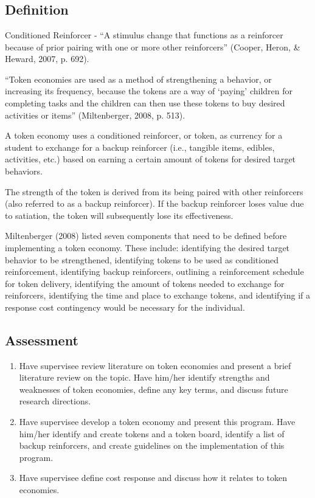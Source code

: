 \section[\fourfTwo{}]{\fourfTwo{}%
              }
\subsection{Definition}
Conditioned Reinforcer - ``A stimulus change that functions as a reinforcer because of prior pairing with one or more other reinforcers'' (Cooper, Heron, \& Heward, 2007, p. 692).

``Token economies are used as a method of strengthening a behavior, or increasing its frequency, because the tokens are a way of ‘paying' children for completing tasks and the children can then use these tokens to buy desired activities or items'' (Miltenberger, 2008, p. 513).

A token economy uses a conditioned reinforcer, or token, as currency for a student to exchange for a backup reinforcer (i.e., tangible items, edibles, activities, etc.) based on earning a certain amount of tokens for desired target behaviors. 

The strength of the token is derived from its being paired with other reinforcers (also referred to as a backup reinforcer). If the backup reinforcer loses value due to satiation, the token will subsequently lose its effectiveness.

Miltenberger (2008) listed seven components that need to be defined before implementing a token economy. These include: identifying the desired target behavior to be strengthened, identifying tokens to be used as conditioned reinforcement, identifying backup reinforcers, outlining a reinforcement schedule for token delivery, identifying the amount of tokens needed to exchange for reinforcers, identifying the time and place to exchange tokens, and identifying if a response cost contingency would be necessary for the individual. 


\subsection{Assessment}
\begin{enumerate}
\item Have supervisee review literature on token economies and present a brief literature review on the topic. Have him/her identify strengths and weaknesses of token economies, define any key terms, and discuss future research directions.
\item Have supervisee develop a token economy and present this program. Have him/her identify and create tokens and a token board, identify a list of backup reinforcers, and create guidelines on the implementation of this program.
\item Have supervisee define cost response and discuss how it relates to token economies.
\end{enumerate}
%
